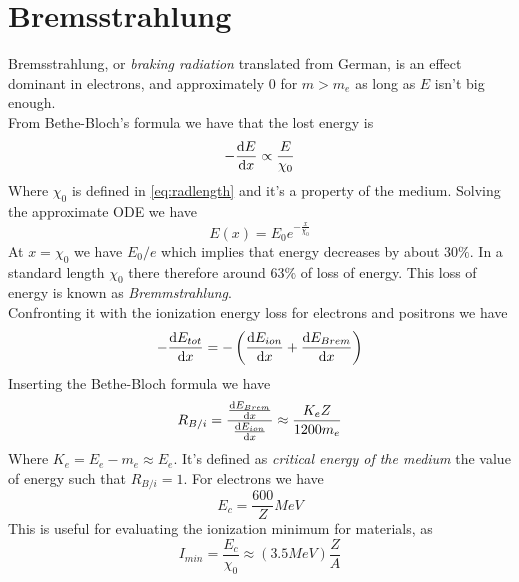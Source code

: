 \documentclass[../qm.tex]{subfiles}
\begin{document}
\section{Bremsstrahlung}
Bremsstrahlung, or \emph{braking radiation} translated from German, is an effect dominant in electrons, and approximately $0$ for $m>m_e$ as long as $E$ isn't big enough.\\
From Bethe-Bloch's formula we have that the lost energy is
\begin{equation*}
	-\dv{E}{x}\propto\frac{E}{\chi_0}
\end{equation*}
Where $\chi_0$ is defined in \eqref{eq:radlength} and it's a property of the medium. Solving the approximate ODE we have
\begin{equation}
	E(x)=E_0e^{-\frac{x}{\chi_0}}
	\label{eq:bremmstrahlungenergyloss}
\end{equation}
At $x=\chi_0$ we have $E_0/e$ which implies that energy decreases by about $30\%$. In a standard length $\chi_0$ there therefore around $63\%$ of loss of energy. This loss of energy is known as \emph{Bremmstrahlung}.\\
Confronting it with the ionization energy loss for electrons and positrons we have
\begin{equation*}
	\begin{aligned}
		-\dv{E_{tot}}{x}=-\left( \dv{E_{ion}}{x}+\dv{E_{Brem}}{x} \right)
	\end{aligned}
\end{equation*}
Inserting the Bethe-Bloch formula we have
\begin{equation*}
	R_{B/i}=\frac{\dv{E_{Brem}}{x}}{\dv{E_{ion}}{x}}\approx\frac{K_eZ}{1200m_e}
\end{equation*}
Where $K_e=E_e-m_e\approx E_e$. It's defined as \emph{critical energy of the medium} the value of energy such that $R_{B/i}=1$. For electrons we have
\begin{equation*}
	E_c=\frac{600}{Z}\unit{MeV}
\end{equation*}
This is useful for evaluating the ionization minimum for materials, as
\begin{equation*}
	I_{min}=\frac{E_c}{\chi_0}\approx(3.5\unit{MeV})\frac{Z}{A}
\end{equation*}
\end{document}
